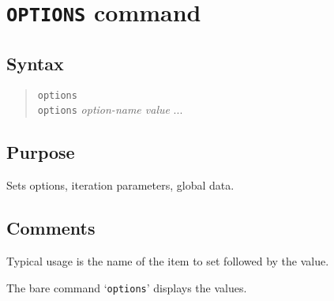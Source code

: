 %
%
%
%
\section{{\tt OPTIONS} command}
\subsection{Syntax}
\begin{verse}
{\tt options}\\
{\tt options} {\it option-name value} ...
\end{verse}
\subsection{Purpose}

Sets options, iteration parameters, global data.
\subsection{Comments}

Typical usage is the name of the item to set followed by the
value.

The bare command `{\tt options}' displays the values.


